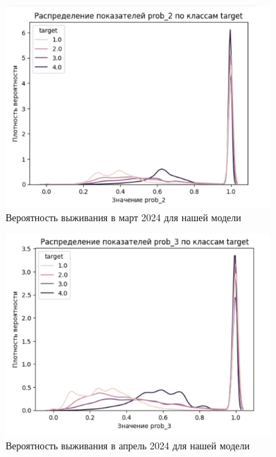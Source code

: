 \documentclass[a4paper,14pt,oneside,openany]{memoir}
\begin{document}
\begin{figure}[H]
	\includegraphics[width=0.9\textwidth]{../figures/prob_2_ours.png}
	\caption{Вероятность выживания в март 2024 для нашей модели}
\end{figure}

\begin{figure}[H]
	\includegraphics[width=0.9\textwidth]{../figures/prob_3_ours.png}
	\caption{Вероятность выживания в апрель 2024 для нашей модели}
\end{figure}
\end{document}
